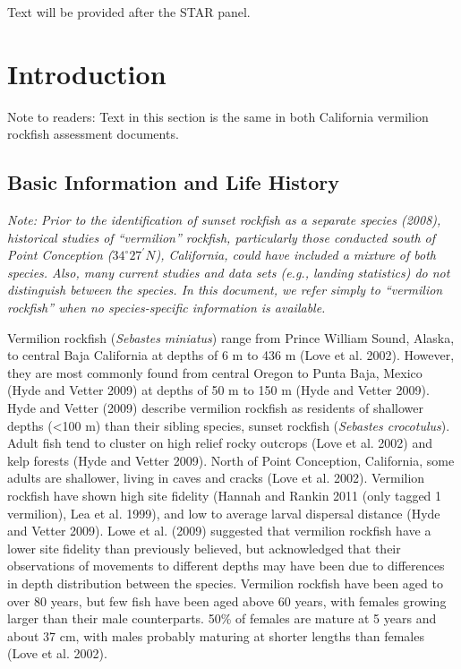 \documentclass[
  english,
  a4paper,
]{article}
\begin{document}
Text will be provided after the STAR panel.

\pagebreak
\setlength{\parskip}{5mm plus1mm minus1mm}
\setcounter{page}{1}
\renewcommand{\thefigure}{\arabic{figure}}
\renewcommand{\thetable}{\arabic{table}}
\setcounter{table}{0}
\setcounter{figure}{0}

\hypertarget{introduction}{%
\section{Introduction}\label{introduction}}

Note to readers: Text in this section is the same in both California vermilion rockfish assessment
documents.

\hypertarget{basic-information-and-life-history}{%
\subsection{Basic Information and Life History}\label{basic-information-and-life-history}}

\emph{Note: Prior to the identification of sunset rockfish as a separate species (2008), historical studies of ``vermilion'' rockfish, particularly those conducted south of Point Conception ($34^\circ 27^\prime N$), California, could have included a mixture of both species. Also, many current studies and data sets (e.g., landing statistics) do not distinguish between the species. In this document, we refer simply to ``vermilion rockfish'' when no species-specific information is available.}

Vermilion rockfish (\emph{Sebastes miniatus}) range from Prince William Sound, Alaska, to central Baja California at
depths of 6 m to 436 m (Love et al. 2002). However, they are most commonly found from central Oregon
to Punta Baja, Mexico (Hyde and Vetter 2009) at depths of 50 m to 150 m (Hyde and Vetter 2009). Hyde and Vetter
(2009) describe vermilion rockfish as residents of shallower depths (\textless100 m) than their sibling species,
sunset rockfish (\emph{Sebastes crocotulus}). Adult fish tend to cluster on high relief rocky outcrops (Love et al. 2002)
and kelp forests (Hyde and Vetter 2009). North of Point Conception, California, some adults are shallower,
living in caves and cracks (Love et al. 2002). Vermilion rockfish have shown high site fidelity
(Hannah and Rankin 2011 (only tagged 1 vermilion), Lea et al. 1999), and low to average larval dispersal
distance (Hyde and Vetter 2009). Lowe et al. (2009) suggested that vermilion rockfish
have a lower site fidelity than previously believed, but acknowledged that their
observations of movements to different depths may have been due to differences in depth distribution between the species.
Vermilion rockfish have been aged to over 80 years, but few fish have been aged above 60 years, with females growing larger than their male counterparts. 50\% of females are mature at 5 years and about
37 cm, with males probably maturing at shorter lengths than females (Love et al. 2002).
\end{document}

